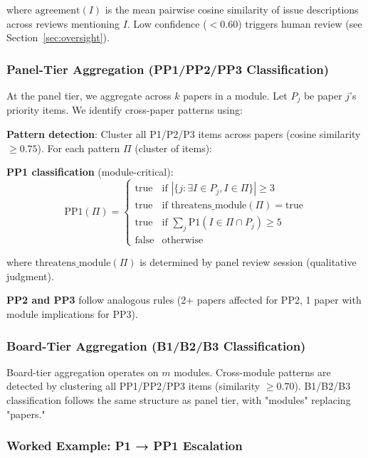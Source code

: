 where $\text{agreement}(I)$ is the mean pairwise cosine similarity of issue descriptions across reviews mentioning $I$. Low confidence ($< 0.60$) triggers human review (see Section~\ref{sec:oversight}).

\subsubsection{Panel-Tier Aggregation (PP1/PP2/PP3 Classification)}

At the panel tier, we aggregate across $k$ papers in a module. Let $P_j$ be paper $j$'s priority items. We identify cross-paper patterns using:

\textbf{Pattern detection}: Cluster all P1/P2/P3 items across papers (cosine similarity $\geq 0.75$). For each pattern $\Pi$ (cluster of items):

\textbf{PP1 classification} (module-critical):
\begin{equation}
\text{PP1}(\Pi) = \begin{cases}
\text{true} & \text{if } |\{j : \exists I \in P_j, I \in \Pi\}| \geq 3 \\
\text{true} & \text{if } \text{threatens\_module}(\Pi) = \text{true} \\
\text{true} & \text{if } \sum_{j} \text{P1}(I \in \Pi \cap P_j) \geq 5 \\
\text{false} & \text{otherwise}
\end{cases}
\end{equation}

where $\text{threatens\_module}(\Pi)$ is determined by panel review session (qualitative judgment).

\textbf{PP2 and PP3} follow analogous rules (2+ papers affected for PP2, 1 paper with module implications for PP3).

\subsubsection{Board-Tier Aggregation (B1/B2/B3 Classification)}

Board-tier aggregation operates on $m$ modules. Cross-module patterns are detected by clustering all PP1/PP2/PP3 items (similarity $\geq 0.70$). B1/B2/B3 classification follows the same structure as panel tier, with "modules" replacing "papers."

\subsubsection{Worked Example: P1 → PP1 Escalation}

